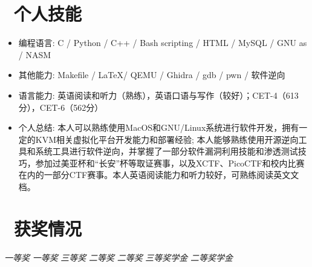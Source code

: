 \documentclass{resume}
\begin{document}
\section{\faCogs\ 个人技能}
\begin{itemize}[parsep=0.5ex]
  \item 编程语言: C / Python / C++ / Bash scripting / HTML / MySQL / GNU as / NASM
  \item 其他能力: Makefile / \LaTeX / QEMU / Ghidra / gdb / pwn / 软件逆向 
  \item 语言能力: 英语阅读和听力（熟练），英语口语与写作（较好）；CET-4（613分），CET-6（562分）
  \item 个人总结: 本人可以熟练使用MacOS和GNU/Linux系统进行软件开发，拥有一定的KVM相关虚拟化平台开发能力和部署经验; 本人能够熟练使用开源逆向工具和系统工具进行软件逆向，并掌握了一部分软件漏洞利用技能和渗透测试技巧，参加过美亚杯和“长安”杯等取证赛事，以及XCTF、PicoCTF和校内比赛在内的一部分CTF赛事。本人英语阅读能力和听力较好，可熟练阅读英文文档。
\end{itemize}

\section{\faTrophy\ 获奖情况}
 {\textit{一等奖}}
 {\textit{一等奖}}
 {\textit{三等奖}}
 {\textit{二等奖}}
 {\textit{二等奖}}
 {\textit{三等奖学金}}
 {\textit{二等奖学金}}

%
%
\end{document}
